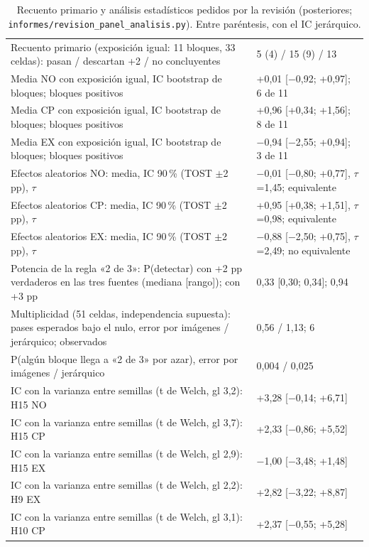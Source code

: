 \begin{table}[H]\centering\scriptsize
\caption{Recuento primario y análisis estadísticos pedidos por la revisión (posteriores; \texttt{informes/revision\_panel\_analisis.py}). Entre paréntesis, con el IC jerárquico.}\label{tab:s-panel}
\begin{tabular}{@{}p{8.6cm} p{6.6cm}@{}}\toprule
Recuento primario (exposición igual: 11 bloques, 33 celdas): pasan / descartan +2 / no concluyentes & 5 (4) / 15 (9) / 13 \\
Media NO con exposición igual, IC bootstrap de bloques; bloques positivos & +0{,}01 [$-$0{,}92; +0{,}97]; 6 de 11 \\
Media CP con exposición igual, IC bootstrap de bloques; bloques positivos & +0{,}96 [+0{,}34; +1{,}56]; 8 de 11 \\
Media EX con exposición igual, IC bootstrap de bloques; bloques positivos & $-$0{,}94 [$-$2{,}55; +0{,}94]; 3 de 11 \\
Efectos aleatorios NO: media, IC 90\,\% (TOST $\pm$2 pp), $\tau$ & $-$0{,}01 [$-$0{,}80; +0{,}77], $\tau$=1{,}45; equivalente \\
Efectos aleatorios CP: media, IC 90\,\% (TOST $\pm$2 pp), $\tau$ & +0{,}95 [+0{,}38; +1{,}51], $\tau$=0{,}98; equivalente \\
Efectos aleatorios EX: media, IC 90\,\% (TOST $\pm$2 pp), $\tau$ & $-$0{,}88 [$-$2{,}50; +0{,}75], $\tau$=2{,}49; no equivalente \\
Potencia de la regla «2 de 3»: P(detectar) con +2 pp verdaderos en las tres fuentes (mediana [rango]); con +3 pp & 0{,}33 [0{,}30; 0{,}34]; 0{,}94 \\
Multiplicidad (51 celdas, independencia supuesta): pases esperados bajo el nulo, error por imágenes / jerárquico; observados & 0{,}56 / 1{,}13; 6 \\
P(algún bloque llega a «2 de 3» por azar), error por imágenes / jerárquico & 0{,}004 / 0{,}025 \\
IC con la varianza entre semillas (t de Welch, gl 3{,}2): H15 NO & +3{,}28 [$-$0{,}14; +6{,}71] \\
IC con la varianza entre semillas (t de Welch, gl 3{,}7): H15 CP & +2{,}33 [$-$0{,}86; +5{,}52] \\
IC con la varianza entre semillas (t de Welch, gl 2{,}9): H15 EX & $-$1{,}00 [$-$3{,}48; +1{,}48] \\
IC con la varianza entre semillas (t de Welch, gl 2{,}2): H9 EX & +2{,}82 [$-$3{,}22; +8{,}87] \\
IC con la varianza entre semillas (t de Welch, gl 3{,}1): H10 CP & +2{,}37 [$-$0{,}55; +5{,}28] \\

\end{tabular}
\end{table}
